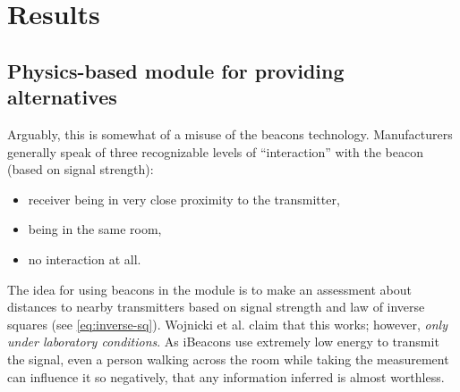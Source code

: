 \chapter{Results}
\label{cha:results}

\section{Physics-based module for providing alternatives}
\label{sec:physics-module}


 Arguably, this is somewhat of a misuse of the beacons technology. Manufacturers generally speak of three recognizable levels of ``interaction'' with the beacon (based on signal strength): \begin{itemize}
 	\item receiver being in very close proximity to the transmitter,
 	\item being in the same room,
 	\item no interaction at all.
 \end{itemize}
 
The idea for using beacons in the module is to make an assessment about distances to nearby transmitters based on signal strength and law of inverse squares (see \cref{eq:inverse-sq}). Wojnicki et al. claim that this works; however, \emph{only under laboratory conditions}.  As iBeacons use extremely low energy to transmit the signal, even a person walking across the room while taking the measurement can influence it so negatively, that any information inferred is almost worthless.

